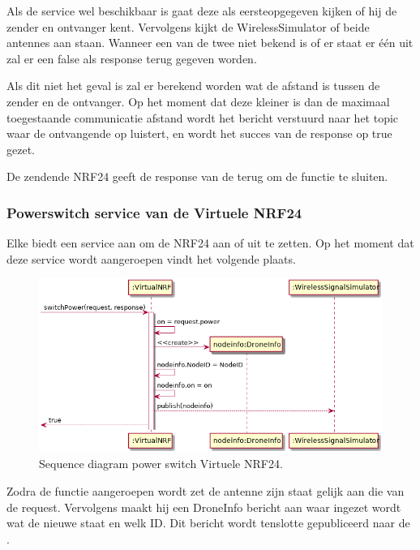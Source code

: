 \documentclass[a4paper, 11pt, oneside]{report}
\begin{document}
Als de service wel beschikbaar is gaat deze als eersteopgegeven kijken of hij de zender en ontvanger kent.
Vervolgens kijkt de WirelessSimulator of beide antennes aan staan.
Wanneer een van de twee niet bekend is of er staat er één uit zal er een false als response terug gegeven worden.

Als dit niet het geval is zal er berekend worden wat de afstand is tussen de zender en de ontvanger.
Op het moment dat deze kleiner is dan de maximaal toegestaande communicatie afstand wordt het bericht verstuurd naar het topic waar de ontvangende  op luistert, en wordt het succes van de response op true gezet.

De zendende NRF24 geeft de response van de  terug om de functie te sluiten.

\subsubsection{Powerswitch service van de Virtuele NRF24}
\label{DetailedDesign:ros:sequence:powerswitch}

Elke  biedt een service aan om de NRF24 aan of uit te zetten.
Op het moment dat deze service wordt aangeroepen vindt het volgende plaats. 

\begin{figure}[H]
	\begin{center}\includegraphics[width=.8\linewidth]{UML/out/ros/sequence/powerSwitch/powerSwitch.png}\end{center}
	\caption{Sequence diagram power switch Virtuele NRF24.}
	\label{fig:ros:sequence:sequence:powerswitch}
\end{figure}

Zodra de functie aangeroepen wordt zet de antenne zijn staat gelijk aan die van de request.
Vervolgens maakt hij een DroneInfo bericht aan waar ingezet wordt wat de nieuwe staat en welk ID.
Dit bericht wordt tenslotte gepubliceerd naar de .
\end{document}
